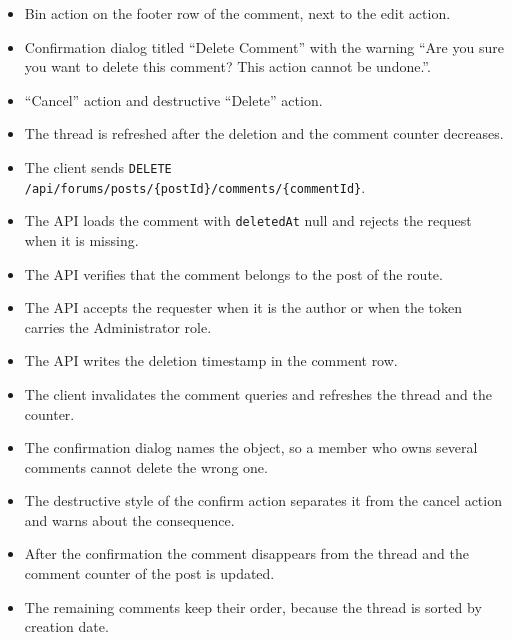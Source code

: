 \begin{itemize}[leftmargin=1.6em,topsep=3pt,itemsep=2pt,parsep=0pt,label=$\bullet$]
      \item Bin action on the footer row of the comment, next to the edit action.
      \item Confirmation dialog titled ``Delete Comment'' with the warning ``Are you sure
            you want to delete this comment? This action cannot be undone.''.
      \item ``Cancel'' action and destructive ``Delete'' action.
      \item The thread is refreshed after the deletion and the comment counter decreases.
\end{itemize}

\begin{itemize}[leftmargin=1.6em,topsep=3pt,itemsep=2pt,parsep=0pt,label=$\bullet$]
      \item The client sends \texttt{DELETE
                  /api/forums/posts/\{postId\}/comments/\{commentId\}}.
      \item The API loads the comment with \texttt{deletedAt} null and rejects the request
            when it is missing.
      \item The API verifies that the comment belongs to the post of the route.
      \item The API accepts the requester when it is the author or when the token carries
            the Administrator role.
      \item The API writes the deletion timestamp in the comment row.
      \item The client invalidates the comment queries and refreshes the thread and the
            counter.
\end{itemize}

\begin{itemize}[leftmargin=1.6em,topsep=3pt,itemsep=2pt,parsep=0pt,label=$\bullet$]
      \item The confirmation dialog names the object, so a member who owns several comments
            cannot delete the wrong one.
      \item The destructive style of the confirm action separates it from the cancel action
            and warns about the consequence.
      \item After the confirmation the comment disappears from the thread and the comment
            counter of the post is updated.
      \item The remaining comments keep their order, because the thread is sorted by
            creation date.
\end{itemize}

